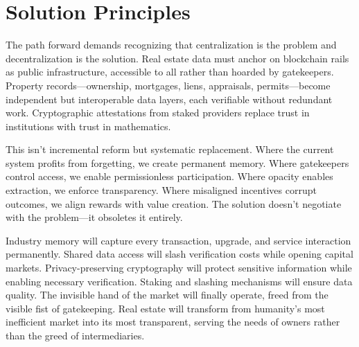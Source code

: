 \section{Solution Principles}

The path forward demands recognizing that centralization is the problem and decentralization is the solution. Real estate data must anchor on blockchain rails as public infrastructure, accessible to all rather than hoarded by gatekeepers. Property records—ownership, mortgages, liens, appraisals, permits—become independent but interoperable data layers, each verifiable without redundant work. Cryptographic attestations from staked providers replace trust in institutions with trust in mathematics.

This isn't incremental reform but systematic replacement. Where the current system profits from forgetting, we create permanent memory. Where gatekeepers control access, we enable permissionless participation. Where opacity enables extraction, we enforce transparency. Where misaligned incentives corrupt outcomes, we align rewards with value creation. The solution doesn't negotiate with the problem—it obsoletes it entirely.

Industry memory will capture every transaction, upgrade, and service interaction permanently. Shared data access will slash verification costs while opening capital markets. Privacy-preserving cryptography will protect sensitive information while enabling necessary verification. Staking and slashing mechanisms will ensure data quality. The invisible hand of the market will finally operate, freed from the visible fist of gatekeeping. Real estate will transform from humanity's most inefficient market into its most transparent, serving the needs of owners rather than the greed of intermediaries.